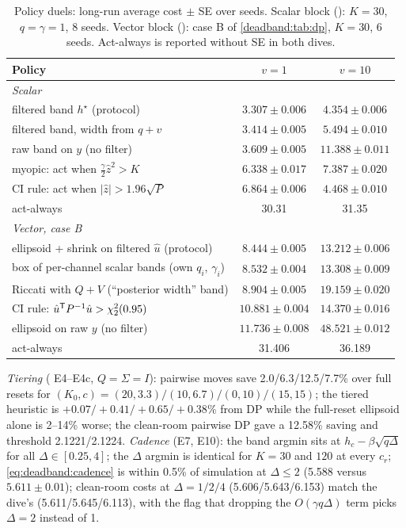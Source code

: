 \begin{table}[htbp]
\centering\small
\caption{Policy duels: long-run average cost $\pm$ SE over seeds. Scalar block (): $K = 30$, $q = \gamma = 1$, 8 seeds. Vector block (): case B of \cref{deadband:tab:dp}, $K = 30$, 6 seeds. Act-always is reported without SE in both dives.}
\label{deadband:tab:duel}
\begin{tabular}{lcc}
\toprule
Policy & $v = 1$ & $v = 10$ \\
\midrule
\multicolumn{3}{l}{\emph{Scalar}} \\
filtered band $h^\star$ (protocol) & $3.307 \pm 0.006$ & $4.354 \pm 0.006$ \\
filtered band, width from $q + v$ & $3.414 \pm 0.005$ & $5.494 \pm 0.010$ \\
raw band on $y$ (no filter) & $3.609 \pm 0.005$ & $11.388 \pm 0.011$ \\
myopic: act when $\tfrac{\gamma}{2}\hat z^2 > K$ & $6.338 \pm 0.017$ & $7.387 \pm 0.020$ \\
CI rule: act when $|\hat z| > 1.96\sqrt P$ & $6.864 \pm 0.006$ & $4.468 \pm 0.010$ \\
act-always & 30.31 & 31.35 \\
\midrule
\multicolumn{3}{l}{\emph{Vector, case B}} \\
ellipsoid + shrink on filtered $\hat u$ (protocol) & $8.444 \pm 0.005$ & $13.212 \pm 0.006$ \\
box of per-channel scalar bands (own $q_i$, $\gamma_i$) & $8.532 \pm 0.004$ & $13.308 \pm 0.009$ \\
Riccati with $Q + V$ (``posterior width'' band) & $8.904 \pm 0.005$ & $19.159 \pm 0.020$ \\
CI rule: $\hat u^{\mathsf{T}} P^{-1}\hat u > \chi^2_2(0.95)$ & $10.881 \pm 0.004$ & $14.370 \pm 0.016$ \\
ellipsoid on raw $y$ (no filter) & $11.736 \pm 0.008$ & $48.521 \pm 0.012$ \\
act-always & 31.406 & 36.189 \\
\bottomrule
\end{tabular}
\end{table}

\emph{Tiering} ( E4--E4c, $Q = \Sigma = I$): pairwise moves save 2.0/6.3/12.5/7.7\% over full resets for $(K_0, c) = (20, 3.3)/(10, 6.7)/(0, 10)/(15, 15)$; the tiered heuristic is $+0.07/+0.41/+0.65/+0.38\%$ from DP while the full-reset ellipsoid alone is 2--14\% worse; the clean-room pairwise DP gave a 12.58\% saving and threshold 2.1221/2.1224. \emph{Cadence} (E7, E10): the band argmin sits at $h_c - \beta\sqrt{q\Delta}$ for all $\Delta \in [0.25, 4]$; the $\Delta$ argmin is identical for $K = 30$ and $120$ at every $c_r$; \cref{eq:deadband:cadence} is within 0.5\% of simulation at $\Delta \le 2$ (5.588 versus $5.611 \pm 0.01$); clean-room costs at $\Delta = 1/2/4$ (5.606/5.643/6.153) match the dive's (5.611/5.645/6.113), with the flag that dropping the $O(\gamma q\Delta)$ term picks $\Delta = 2$ instead of 1.

